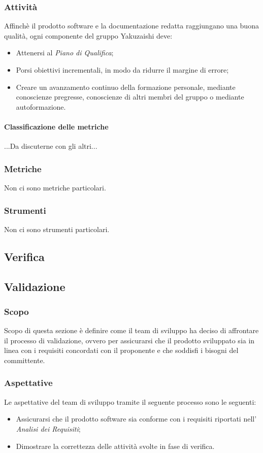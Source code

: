 \subsubsection{Attività}
Affinchè il prodotto software e la documentazione redatta raggiungano una buona qualità, ogni componente del gruppo Yakuzaishi deve:
\begin{itemize}
    \item Attenersi al \textit{Piano di Qualifica};
    \item Porsi obiettivi incrementali, in modo da ridurre il margine di errore;
    \item Creare un avanzamento continuo della formazione personale, mediante conoscienze pregresse, conoscienze di altri membri del gruppo o mediante autoformazione. 
 \end {itemize}   
\paragraph{Classificazione delle metriche}
...Da discuterne con gli altri...
\subsubsection{Metriche}
Non ci sono metriche particolari.
\subsubsection{Strumenti}
Non ci sono strumenti particolari.



\subsection{Verifica}



\subsection{Validazione}\label{subsection: validazione}
\subsubsection{Scopo}
Scopo di questa sezione è definire come il team di sviluppo ha deciso di affrontare il processo di validazione, ovvero per assicurarsi che il prodotto sviluppato sia in linea con i requisiti concordati con il proponente e che soddisfi i bisogni del committente.
\subsubsection{Aspettative}
Le aspettative del team di sviluppo tramite il seguente processo sono le seguenti: 
\begin{itemize}
    \item Assicurarsi che il prodotto software sia conforme con i requisiti riportati nell' \textit{Analisi dei Requisiti};
    \item  Dimostrare la correttezza delle attività svolte in fase di verifica.
\end{itemize}
